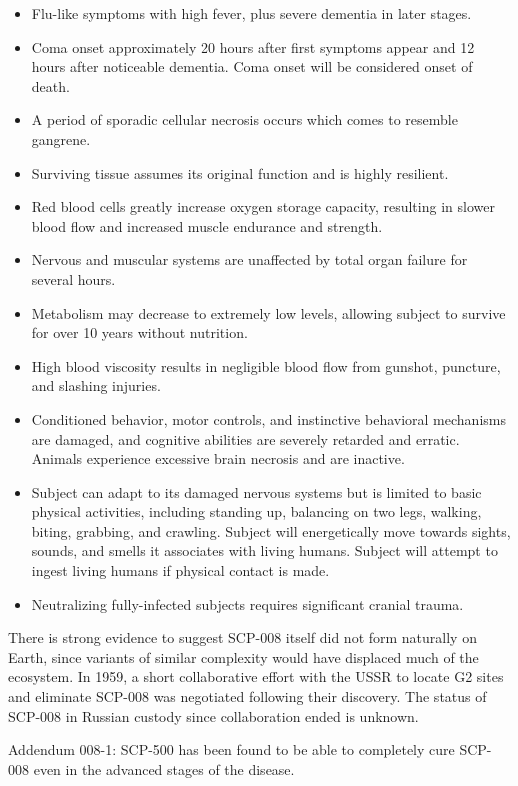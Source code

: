 \documentclass[a4paper, 11pt]{article}
\begin{document}
\begin{itemize}
\item Flu-like symptoms with high fever, plus severe dementia in later stages.
\item Coma onset approximately 20 hours after first symptoms appear and 12 hours after noticeable dementia. Coma onset will be considered onset of death.
\item A period of sporadic cellular necrosis occurs which comes to resemble gangrene. \item Surviving tissue assumes its original function and is highly resilient.
\item Red blood cells greatly increase oxygen storage capacity, resulting in slower blood flow and increased muscle endurance and strength.
\item Nervous and muscular systems are unaffected by total organ failure for several hours.
\item Metabolism may decrease to extremely low levels, allowing subject to survive for over 10 years without nutrition.
\item High blood viscosity results in negligible blood flow from gunshot, puncture, and slashing injuries.
\item Conditioned behavior, motor controls, and instinctive behavioral mechanisms are damaged, and cognitive abilities are severely retarded and erratic. Animals experience excessive brain necrosis and are inactive.
\item Subject can adapt to its damaged nervous systems but is limited to basic physical activities, including standing up, balancing on two legs, walking, biting, grabbing, and crawling. Subject will energetically move towards sights, sounds, and smells it associates with living humans. Subject will attempt to ingest living humans if physical contact is made.
\item Neutralizing fully-infected subjects requires significant cranial trauma.
\end{itemize}
There is strong evidence to suggest SCP-008 itself did not form naturally on Earth, since variants of similar complexity would have displaced much of the ecosystem. In 1959, a short collaborative effort with the USSR to locate G2 sites and eliminate SCP-008 was negotiated following their discovery. The status of SCP-008 in Russian custody since collaboration ended is unknown.

Addendum 008-1: SCP-500 has been found to be able to completely cure SCP-008 even in the advanced stages of the disease.
\end{document}
